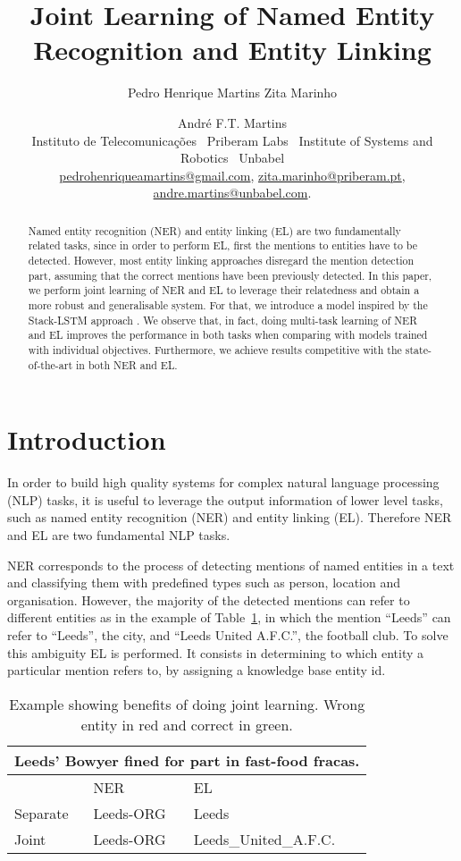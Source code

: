 \documentclass[11pt,a4paper,dvipsnames]{article}
\title{Joint Learning of Named Entity Recognition and Entity Linking}
\author{Pedro Henrique Martins\textsuperscript{\Neptune} \quad
        Zita Marinho\textsuperscript{\Moon\Scorpio} \and
        Andr\'e F.T. Martins\textsuperscript{\Neptune\Saturn} \\
\textsuperscript{\Neptune}Instituto de Telecomunica\c{c}\~oes~
\textsuperscript{\Moon}Priberam Labs~
\textsuperscript{\Scorpio}Institute of Systems and Robotics~ 
\textsuperscript{\Saturn}Unbabel\\
\href{mailto:pedrohenriqueamartins@gmail.com}{pedrohenriqueamartins@gmail.com},\quad
\href{mailto:zita.marinho@priberam.pt}{zita.marinho@priberam.pt}, \\
\href{mailto:andre.martins@unbabel.com}{ andre.martins@unbabel.com}.}
\date{}
\begin{document}
\maketitle
\begin{abstract}
Named entity recognition (NER) and entity linking (EL) are two fundamentally related tasks, since in order to perform EL, first the mentions to entities have to be detected. However, most entity linking approaches disregard the mention detection part, assuming that the correct mentions have been previously detected. In this paper, we perform joint learning of NER and EL to leverage their relatedness and obtain a more robust and generalisable system. For that, we introduce a model inspired by the Stack-LSTM approach \cite{Dyer_stack_2015}.
We observe that, in fact, doing multi-task learning of NER and EL improves the performance in both tasks when comparing with models trained with individual objectives. Furthermore, we achieve results competitive with the state-of-the-art in both NER and EL.
\end{abstract}

\section{Introduction}

In order to build high quality systems for complex natural language processing (NLP) tasks, it is useful to leverage the output information of lower level tasks, such as named entity recognition (NER) and entity linking (EL). Therefore NER and EL are two fundamental NLP tasks.

NER corresponds to the process of detecting mentions of named entities in a text and classifying them with predefined types such as person, location and organisation. However, the majority of the detected mentions can refer to different entities as in the example of Table~\ref{example}, in which the mention ``Leeds'' can refer to ``Leeds'', the city, and ``Leeds United A.F.C.'', the football club. To solve this ambiguity EL is performed. It consists in determining to which entity a particular mention refers to, by assigning a knowledge base entity id. 

\renewcommand{\arraystretch}{1.4}{
\begin{table}[ht!]
\begin{centering}\small
\begin{tabular}{lll}
\hline 
\multicolumn{3}{c}{Leeds' Bowyer fined for part in fast-food fracas.} \\
\hline
& NER & EL \\
\hline
Separate &  Leeds-ORG &  \textcolor{cornellred}{\textsf{Leeds}}\\
Joint  &  Leeds-ORG & \textcolor{cadmiumgreen}{\textsf{Leeds\_United\_A.F.C.}}\\
\hline 
\end{tabular}
\par\end{centering}
\centering{}\caption{Example showing benefits of doing joint learning. Wrong entity in red and correct in green.}
\label{example}
\end{table}} 
\end{document}
